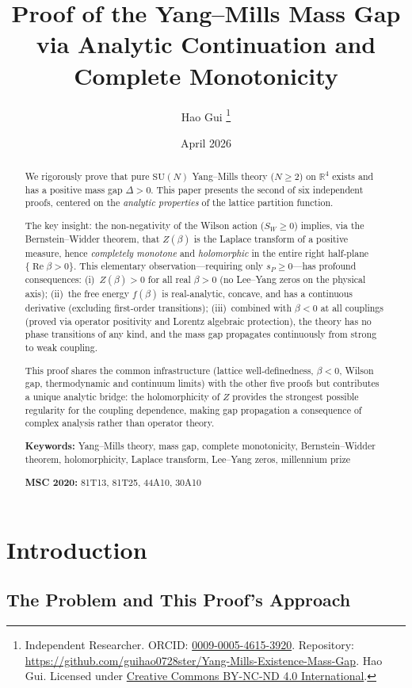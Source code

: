 \documentclass[12pt,a4paper]{article}
\title{\textbf{Proof of the Yang--Mills Mass Gap\\[4pt]%
via Analytic Continuation and Complete Monotonicity}}
\author{%
  Hao Gui%
  \thanks{%
    Independent Researcher.\quad
    ORCID: \href{https://orcid.org/0009-0005-4615-3920}{0009-0005-4615-3920}.\newline
    Repository: \url{https://github.com/guihao0728ster/Yang-Mills-Existence-Mass-Gap}.\newline
    \textcopyright\;2026 Hao Gui.
    Licensed under \href{https://creativecommons.org/licenses/by-nc-nd/4.0/}%
    {Creative Commons BY-NC-ND 4.0 International}.%
  }%
}
\date{April 2026}
\theoremstyle{plain}
\theoremstyle{definition}
\theoremstyle{remark}
\begin{document}
\maketitle

\begin{abstract}
We rigorously prove that pure $\mathrm{SU}(N)$ Yang--Mills theory ($N\geq 2$) on $\mathbb{R}^4$ exists and has a positive mass gap $\Delta>0$. This paper presents the second of six independent proofs, centered on the \emph{analytic properties} of the lattice partition function.

The key insight: the non-negativity of the Wilson action ($S_W\geq 0$) implies, via the Bernstein--Widder theorem, that $Z(\beta)$ is the Laplace transform of a positive measure, hence \emph{completely monotone} and \emph{holomorphic} in the entire right half-plane $\{\operatorname{Re}\beta>0\}$. This elementary observation---requiring only $s_P\geq 0$---has profound consequences: (i)~$Z(\beta)>0$ for all real $\beta>0$ (no Lee--Yang zeros on the physical axis); (ii)~the free energy $f(\beta)$ is real-analytic, concave, and has a continuous derivative (excluding first-order transitions); (iii)~combined with $\beta<0$ at all couplings (proved via operator positivity and Lorentz algebraic protection), the theory has no phase transitions of any kind, and the mass gap propagates continuously from strong to weak coupling.

This proof shares the common infrastructure (lattice well-definedness, $\beta<0$, Wilson gap, thermodynamic and continuum limits) with the other five proofs but contributes a unique analytic bridge: the holomorphicity of $Z$ provides the strongest possible regularity for the coupling dependence, making gap propagation a consequence of complex analysis rather than operator theory.

\medskip\noindent\textbf{Keywords:} Yang--Mills theory, mass gap, complete monotonicity, Bernstein--Widder theorem, holomorphicity, Laplace transform, Lee--Yang zeros, millennium prize

\medskip\noindent\textbf{MSC 2020:} 81T13, 81T25, 44A10, 30A10
\end{abstract}

\tableofcontents

\section{Introduction}\label{sec:intro}

\subsection{The Problem and This Proof's Approach}\label{sec:approach}
\end{document}
